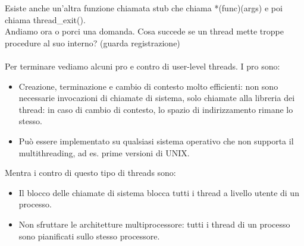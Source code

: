 \hspace{-15pt}Esiste anche un'altra funzione chiamata stub che chiama *(func)(args) e poi chiama thread_exit().\\
Andiamo ora o porci una domanda. Cosa succede se un thread mette troppe procedure al suo interno? (guarda registrazione)\\\\
Per terminare vediamo alcuni pro e contro di user-level threads. I pro sono:
\begin{itemize}
    \item Creazione, terminazione e cambio di contesto molto efficienti: non sono necessarie invocazioni di chiamate di sistema, solo chiamate alla libreria dei thread: in caso di cambio di contesto, lo spazio di indirizzamento rimane lo stesso.
    \item Può essere implementato su qualsiasi sistema operativo che non supporta il multithreading, ad es. prime versioni di UNIX.
\end{itemize}
\hspace{-15pt}Mentra i contro di questo tipo di threads sono:
\begin{itemize}
    \item Il blocco delle chiamate di sistema blocca tutti i thread a livello utente di un processo.
    \item Non sfruttare le architetture multiprocessore: tutti i thread di un processo sono pianificati sullo stesso processore.
\end{itemize}